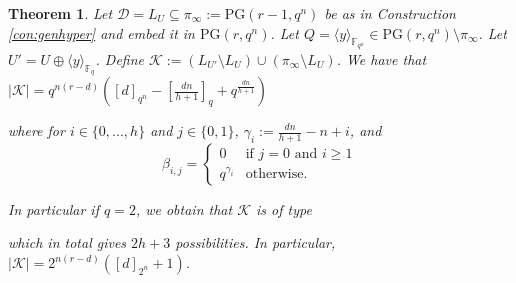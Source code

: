 \documentclass[11pt]{amsart}
\newtheorem{theorem}{Theorem}[section]
\newcommand{\F}{{\mathbb F}}
\newcommand{\PG}{\mathrm{PG}}
\begin{document}
\begin{theorem}\label{th:intersectsizes2}
Let $\mathcal{D}=L_{U} \subseteq \pi_{\infty}:=\PG(r-1,q^n)$ be as in Construction \ref{con:genhyper} and embed it in $\PG(r,q^n)$. Let $Q=\langle y \rangle_{\F_{q^n}} \in \PG(r,q^n) \setminus \pi_{\infty}$. Let $U'=U \oplus \langle y \rangle_{\F_{q}}$.
Define $\mathcal{K}:=(L_{U'}\setminus L_U)\cup (\pi_\infty \setminus L_U)$. 
 We have that
 $|\mathcal{K}|=q^{n(r-d)}\left([d]_{q^n} -\left[\frac{dn}{h+1}\right]_q+ q^{\frac{dn}{h+1}} \right) $

\begin{center}
\end{center}
%
where for $i\in\{0,...,h\}$ and $j \in \{0,1\}$, $\gamma_i:=\frac{dn}{h+1}-n+i$, and 
\[\beta_{i,j} = \begin{cases}
0 & \text{if } j=0 \text{ and } i \geq 1\\
q^{\gamma_i} & \text{otherwise}.
\end{cases}
\]%

In particular if $q=2$, we obtain that $\mathcal{K}$ is of type %
\begin{center}
\end{center}
which in total gives $2h+3$ possibilities. In particular, $|\mathcal{K}|=2^{n(r-d)}\left( [d]_{2^n}+1 \right)$.
\end{theorem}
\end{document}
